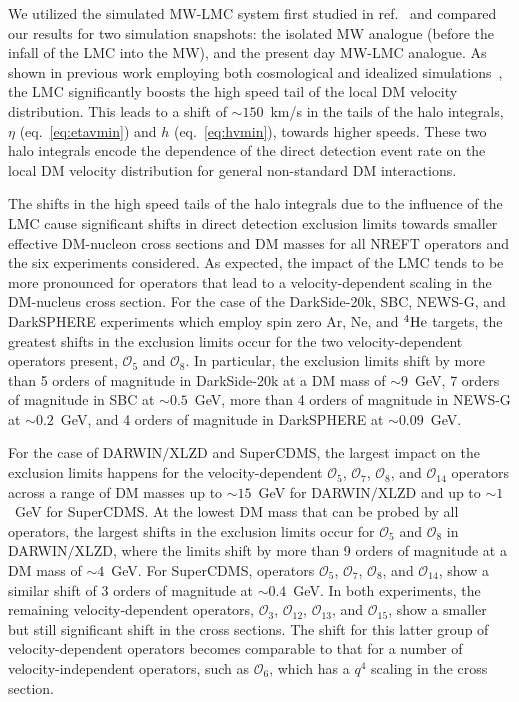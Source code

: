 \documentclass[a4paper,11pt]{article}
\begin{document}
We utilized the simulated MW-LMC system first studied in ref.~\cite{Smith-Orlik:2023kyl} and compared our results for two simulation snapshots: the isolated MW analogue (before the infall of the LMC into the MW), and the present day MW-LMC analogue. As shown in previous work employing both cosmological and idealized simulations~\cite{Smith-Orlik:2023kyl, Besla:2019xbx, Donaldson:2021byu}, the LMC significantly boosts the high speed tail of the local DM velocity distribution.  This leads to a shift of $\sim 150$~km/s in the tails of the halo integrals, $\eta$ (eq.~\eqref{eq:etavmin}) and $h$ (eq.~\eqref{eq:hvmin}), towards higher speeds. These two halo integrals encode the dependence of the direct detection event rate on the local DM velocity distribution for general non-standard DM interactions. 

The shifts in the high speed tails of the halo integrals due to the influence of the LMC cause significant shifts in direct detection exclusion limits towards smaller effective DM-nucleon cross sections and DM masses for all NREFT operators and the six experiments considered. As expected, the impact of the LMC tends to be more pronounced for operators that lead to a velocity-dependent scaling in the DM-nucleus cross section. For the case of the DarkSide-20k, SBC, NEWS-G, and DarkSPHERE experiments which employ spin zero Ar, Ne, and $^4{\rm He}$ targets, the greatest shifts in the exclusion limits occur for the two velocity-dependent operators present, $\mathcal{O}_5$ and $\mathcal{O}_8$. In particular, the exclusion limits shift by more than 5 orders of magnitude in DarkSide-20k at a DM mass of $\sim 9$~GeV, 7 orders of magnitude in SBC at $\sim 0.5$~GeV, more than 4 orders of magnitude in NEWS-G at $\sim 0.2$~GeV, and 4 orders of magnitude in DarkSPHERE at $\sim 0.09$~GeV.

For the case of DARWIN$\slash$XLZD and SuperCDMS, the largest impact on the exclusion limits happens for  the velocity-dependent $\mathcal{O}_5$, $\mathcal{O}_7$, $\mathcal{O}_8$, and $\mathcal{O}_{14}$ operators across a range of DM masses up to $\sim 15$~GeV for DARWIN$\slash$XLZD and up to $\sim 1$~GeV for SuperCDMS. At the lowest DM mass that can be probed by all operators, the largest shifts in the exclusion limits occur for $\mathcal{O}_5$ and $\mathcal{O}_8$ in DARWIN$\slash$XLZD, where the limits shift by more than 9 orders of magnitude at a DM mass of $\sim 4$~GeV. For SuperCDMS, operators $\mathcal{O}_5$, $\mathcal{O}_7$, $\mathcal{O}_8$, and $\mathcal{O}_{14}$, show a similar shift of 3 orders of magnitude at $\sim 0.4$~GeV. In both experiments, the remaining velocity-dependent operators, $\mathcal{O}_{3}$, $\mathcal{O}_{12}$, $\mathcal{O}_{13}$, and $\mathcal{O}_{15}$, show a smaller but still significant shift in the cross sections. The shift for this latter group of velocity-dependent operators becomes comparable to that for a number of velocity-independent operators, such as $\mathcal{O}_{6}$, which has a $q^4$ scaling in the cross section. 
\end{document}
